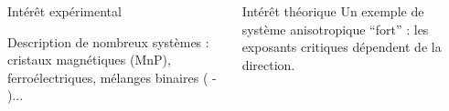 \documentclass[xcolor=dvipsnames]{beamer}
\begin{document}
\begin{frame}


\end{frame}

\begin{frame}

\begin{columns}

\begin{column}{5.5cm}
\begin{block}{Intérêt expérimental}

Description de nombreux systèmes : cristaux magnétiques (MnP), ferroélectriques, mélanges binaires ( - )...

\end{block}
\end{column}

\begin{column}{5.5cm}
\begin{block}{Intérêt théorique}
Un exemple de système anisotropique ``fort'' : les exposants critiques dépendent de la direction.
\end{block}
\end{column}

\end{columns}

\end{frame}
\end{document}
